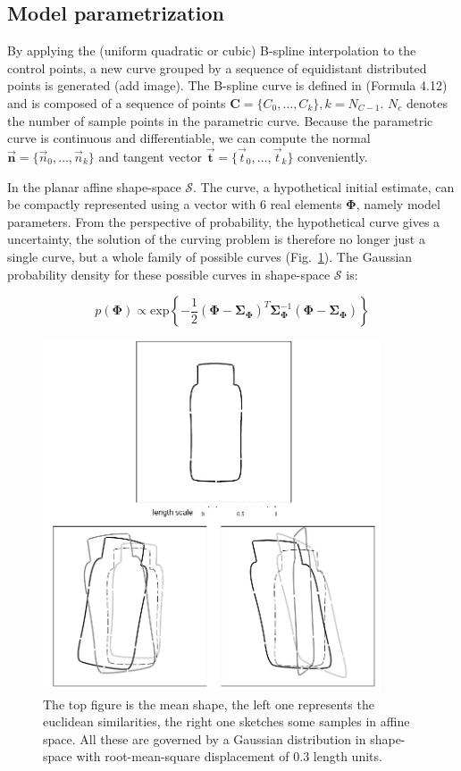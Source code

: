 \subsection{Model parametrization}
\label{sec:mp}

By applying the (uniform quadratic or cubic) B-spline interpolation to the control points, a new curve
grouped by a sequence of equidistant distributed points is generated
(add image). The B-spline curve is defined in (Formula 4.12) and is
composed of a sequence of points $\mathbf{C} = \{C_0, \ldots,
C_{k}\}, k = N_{C-1}$. $N_c$ denotes the number of sample points in the
parametric curve. Because the parametric curve is continuous and
differentiable, we can compute the normal $\vec{\mathbf{n}} = \{\vec{n}_0, \ldots,
\vec{n}_{k}\}$ and tangent vector $\vec{\mathbf{t}} = \{\vec{t}_0, \ldots, \vec{t}_{k}\}$
conveniently. 

In the planar affine shape-space $\mathcal{S}$. The curve, a
hypothetical initial estimate, can be compactly represented using a
vector with 6 real elements $\mathbf{\Phi}$, namely model
parameters. From the perspective of probability, the hypothetical
curve gives a uncertainty, the solution of the curving problem is
therefore no longer just a single curve, but a whole family of
possible curves (Fig.~\ref{fig:prior}). The Gaussian probability density for these possible
curves in shape-space $\mathcal{S}$ is:

\begin{equation}
  \label{eq:prior}
   p(\mathbf{\Phi}) \propto
\mathrm{exp} \left\{ -\frac{1}{2} (\mathbf{\Phi} -
  \mathbf{\Sigma}_{\mathbf{\Phi}})^T \mathbf{\Sigma}_{\mathbf{\Phi}}^{-1} (\mathbf{\Phi} -
  \mathbf{\Sigma}_{\mathbf{\Phi}}) \right\}
\end{equation}

\begin{figure}[htb]
  \centering
  \includegraphics[width=10cm]{images/prior.jpg}
\caption[Sampling from curve families~\cite{blake1998active}]{The top
  figure is the mean shape, the left one represents the euclidean
  similarities, the right one
  sketches some samples in affine space. All these are governed by a
  Gaussian distribution in shape-space with root-mean-square
  displacement of 0.3 length units.}
\label{fig:prior}
\end{figure}

